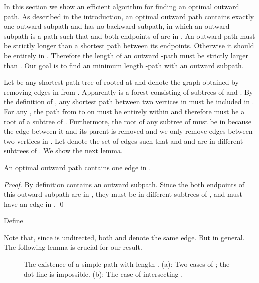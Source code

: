 In this section we show an efficient algorithm for finding an optimal outward path. As described in the introduction, an optimal outward path contains exactly one outward subpath and has no backward subpath, in which an outward subpath is a path  such that  and both endpoints of  are in .
An outward path must be strictly longer than a shortest path between its endpoints. Otherwise it should be entirely in . Therefore the length of an outward -path must be strictly larger than . Our goal is to find an minimum length -path with an outward subpath. 

Let  be any shortest-path tree of  rooted at  and  denote the graph obtained by removing edges in  from .
Apparently  is a forest consisting of subtrees of  and .
By the definition of , any shortest path between two vertices in  must be included in . For any , the path from  to  on  must be entirely within  and therefore  must be a root of a subtree of .
Furthermore, the root of any subtree of  must be in  because the edge between it and its parent is removed and we only remove edges between two vertices in .
Let  denote the set of edges  such that  and  and  are in different subtrees of . 
We show the next lemma.

\begin{lemma}\label{out1}
An optimal outward path  contains one edge in .
\end{lemma}
\begin{proof}
By definition  contains an outward subpath. Since the both endpoints of this outward subpath are in , they must be in different subtrees of , and  must have an edge in .
\qed 
\end{proof}

Define 

Note that, since  is undirected, both  and  denote the same edge. But  in general. The following lemma is crucial for our result. 

\begin{figure}[t]
\begin{center}
\caption{The existence of a simple path with length . (a): Two cases of ; the dot line is impossible. (b): The case of  intersecting .}
\label{outf}
\end{center}
\end{figure}

